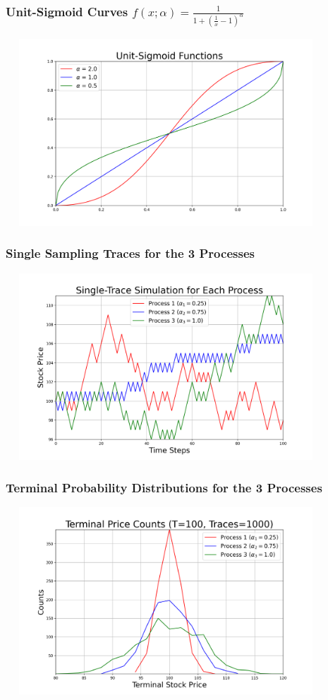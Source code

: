 \documentclass[handout]{beamer}
\begin{document}
\begin{frame}
\frametitle{Unit-Sigmoid Curves $f(x; \alpha) = \frac 1 {1 + (\frac 1 x - 1)^{\alpha}}$}
\includegraphics[width=12cm, height=7cm]{unit_sigmoid_curves.png}
\end{frame}

\begin{frame}
\frametitle{Single Sampling Traces for the 3 Processes}
\includegraphics[width=12cm, height=7cm]{single_traces.png}
\end{frame}

\begin{frame}
\frametitle{Terminal Probability Distributions for the 3 Processes}
\includegraphics[width=12cm, height=7cm]{terminal_distribution.png}
\end{frame}
\end{document}
